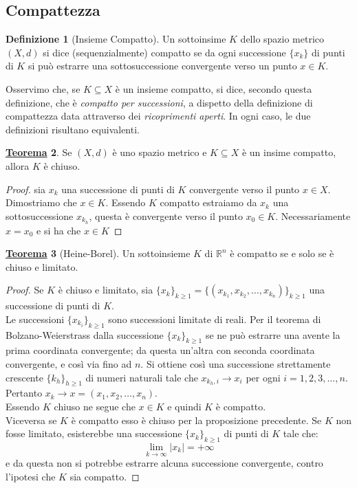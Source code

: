 \documentclass[a4paper,twoside]{article}
\newcommand{\R}{\mathbb{R}}
\theoremstyle{definition}
\newtheorem{theorem}{\color{Red}\underline{\textrm Teorema}}
\newtheorem{definizione}[theorem]{Definizione}
\numberwithin{theorem}{section}
\begin{document}
\subsection{Compattezza}
\begin{definizione}[Insieme Compatto]
    Un sottoinsime $K$ dello spazio metrico $(X,d)$ si dice (sequenzialmente) compatto se da ogni successione $\{x_k\}$ di punti di $K$ si può estrarre una sottosuccessione convergente verso un punto $x\in K$.
\end{definizione}
Osservimo che, se $K\subseteq X$ è un insieme compatto, si dice, secondo questa definizione, che è \emph{compatto per successioni}, a dispetto della definizione di compattezza data attraverso dei \emph{ricoprimenti aperti}. In ogni caso, le due definizioni risultano equivalenti.
\begin{theorem}
    Se $(X,d)$ è uno spazio metrico e $K\subseteq X$ è un insime compatto, allora $K$ è chiuso.
\end{theorem}
\begin{proof}
    sia $x_k$ una successione di punti di $K$ convergente verso il punto $x\in X$. Dimostriamo che $x\in K$. Essendo $K$ compatto estraiamo da $x_k$ una sottosuccessione $x_{k_h}$, questa è convergente verso il punto $x_0\in K$. Necessariamente $x=x_0$ e si ha che $x\in K$
\end{proof}
\begin{theorem}[Heine-Borel]
Un sottoinsieme $K$ di $\R^n$ è compatto se e solo se è chiuso e limitato.    
\end{theorem}
\begin{proof}
 Se $K$ è chiuso e limitato, sia $\{x_k\}_{k\geq 1}=\{\left(x_{k_1},x_{k_2},\dots,x_{k_n}\right)\}_{k\geq 1}$ una successione di punti di $K$.\\ Le successioni $\{x_{k_i}\}_{k\geq 1}$ sono successioni limitate di reali. Per il teorema di Bolzano-Weierstrass dalla successione $\{x_k\}_{k\geq 1}$ se ne può estrarre una avente la prima coordinata convergente; da questa un'altra con seconda coordinata convergente, e così via fino ad $n$. Si ottiene così una successione strettamente crescente $\{k_h\}_{h\geq 1}$ di numeri naturali tale che  $x_{k_h,i}\to x_i$ per ogni $i=1,2,3,\dots,n$. Pertanto $x_k\to x=(x_1,x_2,\dots,x_n)$.\\
 Essendo $K$ chiuso ne segue che $x\in K$ e quindi $K$ è compatto.\\ Viceversa se $K$ è compatto esso è chiuso per la proposizione precedente. Se $K$ non fosse limitato, esisterebbe una successione $\{x_k\}_{k\geq 1}$ di punti di $K$ tale che: $$\lim_{k\to\infty}|x_k|=+\infty$$ e da questa non si potrebbe estrarre alcuna successione convergente, contro l'ipotesi che $K$ sia compatto.
\end{proof}
\end{document}
